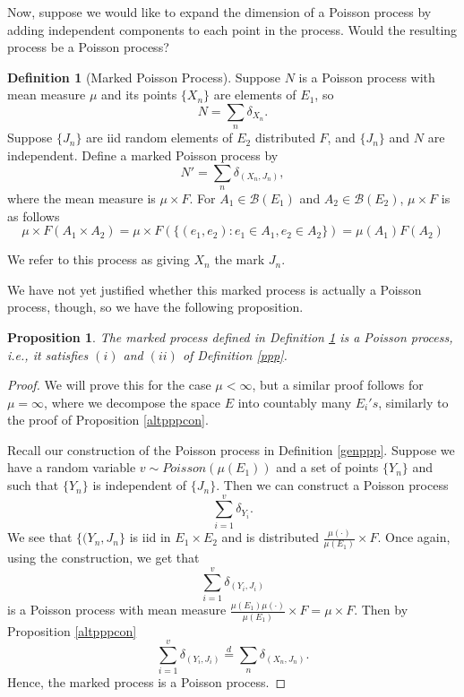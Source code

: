 \documentclass[11pt, oneside]{article}   	%
\newtheorem{proposition}{Proposition}[section]
\theoremstyle{definition}
\newtheorem{definition}{Definition}[section]
\theoremstyle{remark}
\begin{document}
Now, suppose we would like to expand the dimension of a Poisson process by adding independent components to each point in the process. Would the resulting process be a Poisson process?

\begin{definition}[Marked Poisson Process] \label{mpp}
  Suppose $N$ is a Poisson process with mean measure $\mu$ and its points $\{X_n\}$ are elements of $E_1$, so $$N = \sum_{n} \delta_{X_n}.$$
  Suppose $\{J_n\}$ are iid random elements of $E_2$ distributed $F$, and $\{J_n\}$ and $N$ are independent.
  Define a marked Poisson process by
  $$N'=\sum_{n} \delta_{(X_n,J_n)},$$
  where the mean measure is $\mu \times F$. For $A_1 \in \mathcal{B}(E_1)$ and $A_2 \in \mathcal{B}(E_2)$, $\mu \times F$ is as follows
  $$\mu \times F (A_1 \times A_2) = \mu \times F (\{(e_1, e_2) : e_1 \in A_1, e_2 \in A_2 \}) = \mu(A_1) F(A_2)$$
\end{definition}

We refer to this process as giving $X_n$ the mark $J_n$.

We have not yet justified whether this marked process is actually a Poisson process, though, so we have the following proposition.

\begin{proposition} \label{propmpp}
  The marked process defined in Definition \ref{mpp} is a Poisson process, i.e., it satisfies $(i)$ and $(ii)$ of Definition \ref{ppp}.
\end{proposition}

\begin{proof}
  We will prove this for the case $\mu < \infty$, but a similar proof follows for $\mu = \infty$, where we decompose the space $E$ into countably many $E_i's$, similarly to the proof of Proposition \ref{altpppcon}.

  Recall our construction of the Poisson process in Definition \ref{genppp}. Suppose we have a random variable $v \sim \textit{Poisson}(\mu(E_1))$ and a set of points $\{Y_n\}$ and such that $\{Y_n\}$ is independent of $\{J_n\}$. Then we can construct a Poisson process
  $$\sum_{i=1}^v \delta_{Y_i}.$$
  We see that $\{(Y_n, J_n\}$ is iid in $E_1 \times E_2$ and is distributed $\frac{\mu(\cdot)}{\mu(E_1)} \times F$. Once again, using the construction, we get that
  $$\sum_{i=1}^v \delta_{(Y_i,J_i)}$$ is a Poisson process with mean measure $\frac{\mu(E_1)\mu(\cdot)}{\mu(E_1)} \times F= \mu \times F$. Then by Proposition \ref{altpppcon}
  $$\sum_{i=1}^v \delta_{(Y_i,J_i)} \stackrel{d}{=} \sum_{n} \delta_{(X_n,J_n)}.$$
  Hence, the marked process is a Poisson process.
\end{proof}
\end{document}
